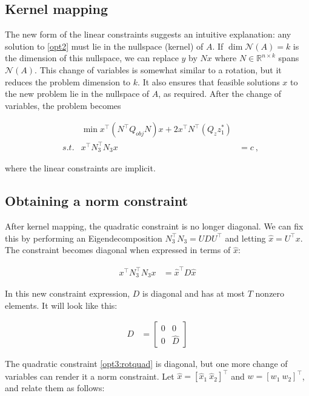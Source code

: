 \documentclass[conference]{IEEEtran}
\begin{document}
\subsection{Kernel mapping}

The new form of the linear constraints suggests an intuitive explanation: any solution to \eqref{opt2} must lie in the nullspace (kernel) of $A$. If $\dim \mathcal{N}(A) =k$ is the dimension of this nullspace, we can replace $y$ by $Nx$ where $N\in\mathbb{R}^{n\times k}$ spans $\mathcal{N}(A)$. This change of variables is somewhat similar to a rotation, but it reduces the problem dimension to $k$. It also ensures that feasible solutions $x$ to the new problem lie in the nullspace of $A$, as required. After the change of variables, the problem becomes

\begin{subequations}\label{opt3}
\begin{align}
\label{opt3:obj} && \min x^\top (N^\top Q_{obj}N) x + 2x^\top N^\top(Q_zz_1^*) &\\
\label{opt3:quad} & s.t. & x^\top N_3^\top N_3 x &= c~,
\end{align}
\end{subequations}

where the linear constraints are implicit.

\subsection{Obtaining a norm constraint}

After kernel mapping, the quadratic constraint is no longer diagonal. We can fix this by performing an Eigendecomposition $N_3^\top N_3 = UDU^\top$ and letting $\hat{x} = U^\top x$. The constraint becomes diagonal when expressed in terms of $\hat{x}$:

\begin{align}
\label{opt3:rotquad} x^\top N_3^\top N_3 x &= \hat{x}^\top D\hat{x}
\end{align}

In this new constraint expression, $D$ is diagonal and has at most $T$ nonzero elements. It will look like this:

\begin{align}
D &= \begin{bmatrix} 0 & 0 \\ 0 & \hat{D} \end{bmatrix}
\end{align}

The quadratic constraint \eqref{opt3:rotquad} is diagonal, but one more change of variables can render it a norm constraint. Let $\hat{x}=[\hat{x}_1~\hat{x}_2]^\top$ and $w = [w_1~w_2]^\top$, and relate them as follows:
\end{document}
